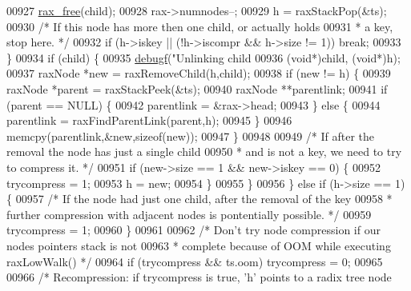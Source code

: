 \begin{DoxyCode}
{{{{{{{{{{{{{{{00927             \hyperlink{rax__malloc_8h_a3adfa16bca6cd23b6e125fd441465e49}{rax\_free}(child);
00928             rax->numnodes--;
00929             h = raxStackPop(&ts);
00930              \textcolor{comment}{/* If this node has more then one child, or actually holds}
00931 \textcolor{comment}{              * a key, stop here. */}
00932             \textcolor{keywordflow}{if} (h->iskey || (!h->iscompr && h->size != 1)) \textcolor{keywordflow}{break};
00933         \}
00934         \textcolor{keywordflow}{if} (child) \{
00935             \hyperlink{rax_8c_a10b215c81aa397dbc44adfb3e436befb}{debugf}(\textcolor{stringliteral}{"Unlinking child %
00936                 (\textcolor{keywordtype}{void}*)child, (\textcolor{keywordtype}{void}*)h);
00937             raxNode *\textcolor{keyword}{new} = raxRemoveChild(h,child);
00938             \textcolor{keywordflow}{if} (\textcolor{keyword}{new} != h) \{
00939                 raxNode *parent = raxStackPeek(&ts);
00940                 raxNode **parentlink;
00941                 \textcolor{keywordflow}{if} (parent == NULL) \{
00942                     parentlink = &rax->head;
00943                 \} \textcolor{keywordflow}{else} \{
00944                     parentlink = raxFindParentLink(parent,h);
00945                 \}
00946                 memcpy(parentlink,&\textcolor{keyword}{new},\textcolor{keyword}{sizeof}(\textcolor{keyword}{new}));
00947             \}
00948 
00949             \textcolor{comment}{/* If after the removal the node has just a single child}
00950 \textcolor{comment}{             * and is not a key, we need to try to compress it. */}
00951             \textcolor{keywordflow}{if} (\textcolor{keyword}{new}->size == 1 && \textcolor{keyword}{new}->iskey == 0) \{
00952                 trycompress = 1;
00953                 h = \textcolor{keyword}{new};
00954             \}
00955         \}
00956     \} \textcolor{keywordflow}{else} \textcolor{keywordflow}{if} (h->size == 1) \{
00957         \textcolor{comment}{/* If the node had just one child, after the removal of the key}
00958 \textcolor{comment}{         * further compression with adjacent nodes is pontentially possible. */}
00959         trycompress = 1;
00960     \}
00961 
00962     \textcolor{comment}{/* Don't try node compression if our nodes pointers stack is not}
00963 \textcolor{comment}{     * complete because of OOM while executing raxLowWalk() */}
00964     \textcolor{keywordflow}{if} (trycompress && ts.oom) trycompress = 0;
00965 
00966     \textcolor{comment}{/* Recompression: if trycompress is true, 'h' points to a radix tree node}
}}}}}}}}}}}}}}}}
\end{DoxyCode}
